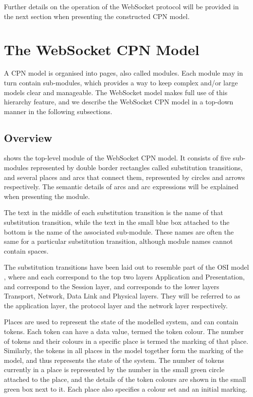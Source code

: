 Further details on the operation of the WebSocket protocol will be provided in
the next section when presenting the constructed CPN model.

\section{The WebSocket CPN Model} \label{sec:ws_cpn_model}

A CPN model is organised into pages, also called modules. Each module may in
turn contain sub-modules, which provides a way to keep complex and/or large
models clear and manageable. The WebSocket model makes full use of this
hierarchy feature, and we describe the WebSocket CPN model in a top-down
manner in the following subsections.

\subsection{Overview}

	
	 shows the top-level  module of the
	WebSocket CPN model. It consists of five sub-modules represented by double
	border rectangles called substitution transitions, and several places
	and arcs that connect them, represented by circles and arrows respectively. 
	The semantic details of arcs and arc expressions will be explained when
	presenting the  module.
	
	
	The text in the middle of each substitution transition is the name of that substitution transition,
	while the text in the small blue box attached to the bottom is the name of the
	associated sub-module. These names are often the same for a particular
	substitution transition, although module names cannot contain spaces.

	The substitution transitions have been laid out to resemble part of the OSI
	model \cite{osi7}, where  and  each correspond to the top two layers Application and
	Presentation,  and 
	correspond to the Session layer, and  corresponds to the
	lower layers Transport, Network, Data Link and Physical layers. They will be
	referred to as the application layer, the protocol layer and the network layer
	respectively.
	
	Places are used to represent the state of the modelled system, and can contain
	tokens. Each token can have a data value, termed the token colour. The number
	of tokens and their colours in a specific place is termed the marking of that
	place. Similarly, the tokens in all places in the model together form the 
	marking of the model, and thus represents the state of the system. The number
	of tokens currently in a place is represented by the number in the small green
	circle attached to the place, and the details of the token colours are shown in
	the small green box next to it. Each place also specifies a colour set
	and an initial marking.
	
